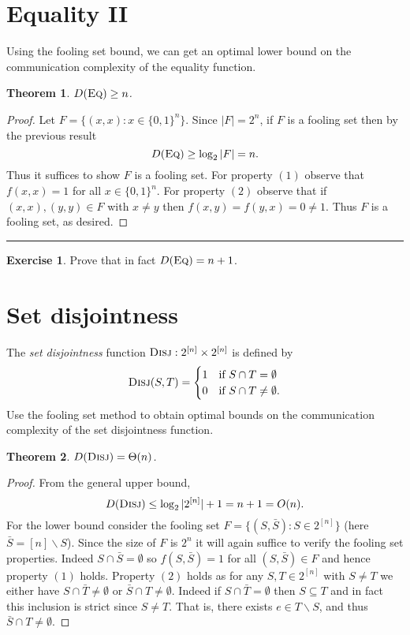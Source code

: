 \documentclass[11pt]{amsart}
\theoremstyle{plain}
\newtheorem{theorem}{Theorem}
\theoremstyle{definition}
\newtheorem{exercise}{Exercise}
\theoremstyle{plain}
\newcommand{\Disj}{\textsc{Disj}}
\newcommand{\Eq}{\textsc{Eq}}
\newcommand{\exercises}{\bigskip \noindent\rule{8cm}{0.4pt} \medskip}
\begin{document}
\newpage \section{Equality II}

Using the fooling set bound, we can get an optimal lower bound on the communication complexity of the equality function.

\begin{theorem}
$D(\Eq) \ge n$.
\end{theorem}

\begin{proof}
Let $F = \{(x,x) : x \in \{0,1\}^n\}$. Since $|F| = 2^n$, if $F$ is a fooling set then by the previous result 
$$D(\Eq) \ge \log_2|F| = n.$$
Thus it suffices to show $F$ is a fooling set. For property $(1)$ observe that $f(x,x) = 1$ for all $x\in\{0,1\}^n$. For property $(2)$ observe that if $(x,x), (y,y) \in F$ with $x\neq y$ then $f(x,y) = f(y,x) = 0\neq 1$. Thus $F$ is a fooling set, as desired.
\end{proof}

\exercises

\begin{exercise}
Prove that in fact $D(\Eq) = n+1$.
\end{exercise}


\newpage \section{Set disjointness}

The \emph{set disjointness} function $\Disj : 2^{[n]} \times 2^{[n]}$ is defined by
\[
\Disj(S,T) = \begin{cases}
1 & \mbox{if } S \cap T = \emptyset \\
0 & \mbox{if } S \cap T \neq \emptyset.
\end{cases}
\]
Use the fooling set method to obtain optimal bounds on the communication complexity of the set disjointness function.

\begin{theorem}
$D(\Disj) = \Theta(n)$.
\end{theorem}

\begin{proof}
From the general upper bound,
$$D(\Disj) \leq \log_2|2^{[n]}| + 1 = n +1 = O(n).$$
For the lower bound consider the fooling set $F = \{(S,\bar{S}) : S \in 2^{[n]}\}$ (here $\bar{S} = [n]\backslash S$). Since the size of $F$ is $2^n$ it will again suffice to verify the fooling set properties. Indeed $S\cap \bar{S}= \emptyset$ so $f(S,\bar{S}) = 1$ for all $(S,\bar{S}) \in F$ and hence property $(1)$ holds. Property $(2)$ holds as for any $S,T \in 2^{[n]}$ with $S\neq T$ we either have $S\cap \bar{T} \neq \emptyset$ or $\bar{S}\cap T \neq \emptyset$.
Indeed if $S\cap \bar{T}= \emptyset$ then $S\subseteq T$ and in fact this inclusion is strict since $S\neq T$. That is, there exists $e \in T\backslash S$, and thus $\bar{S}\cap T \neq \emptyset$.
\end{proof}
\end{document}
